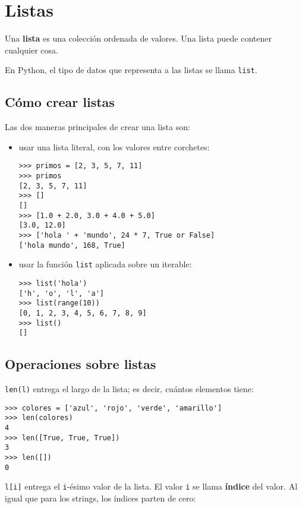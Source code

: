 \chapter{Listas}

Una \textbf{lista} es una colección ordenada de valores. Una lista puede
contener cualquier cosa.

En Python, el tipo de datos que representa a las listas se llama
\lstinline!list!.

\section{Cómo crear listas}

Las dos maneras principales de crear una lista son:

\begin{itemize}
\item
  usar una lista literal, con los valores entre corchetes:

\begin{lstlisting}
>>> primos = [2, 3, 5, 7, 11]
>>> primos
[2, 3, 5, 7, 11]
>>> []
[]
>>> [1.0 + 2.0, 3.0 + 4.0 + 5.0]
[3.0, 12.0]
>>> ['hola ' + 'mundo', 24 * 7, True or False]
['hola mundo', 168, True]
\end{lstlisting}
\end{itemize}

\begin{itemize}
\item
  usar la función \lstinline!list! aplicada sobre un iterable:

\begin{lstlisting}
>>> list('hola')
['h', 'o', 'l', 'a']
>>> list(range(10))
[0, 1, 2, 3, 4, 5, 6, 7, 8, 9]
>>> list()
[]
\end{lstlisting}
\end{itemize}

\section{Operaciones sobre listas}

\lstinline!len(l)! entrega el largo de la lista; es decir, cuántos
elementos tiene:

\begin{lstlisting}
>>> colores = ['azul', 'rojo', 'verde', 'amarillo']
>>> len(colores)
4
>>> len([True, True, True])
3
>>> len([])
0
\end{lstlisting}

\lstinline!l[i]! entrega el \lstinline!i!-ésimo valor de la lista. El
valor \lstinline!i! se llama \textbf{índice} del valor. Al igual que
para los strings, los índices parten de cero:


